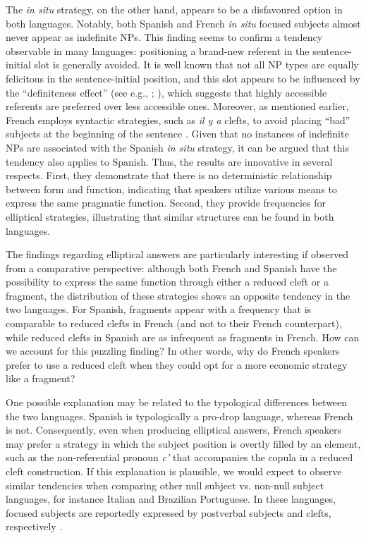 The \textit{in situ} strategy, on the other hand, appears to be a disfavoured option in both languages. Notably, both Spanish and French \textit{in situ} focused subjects almost never appear as indefinite NPs. This finding seems to confirm a tendency observable in many languages: positioning a brand-new referent in the sentence-initial slot is generally avoided. It is well known that not all NP types are equally felicitous in the sentence-initial position, and this slot appears to be influenced by the ``definiteness effect” (see e.g., \cite{keenan1976foregrounding}; \cite{mcnally1998existential}), which suggests that highly accessible referents are preferred over less accessible ones. Moreover, as mentioned earlier, French employs syntactic strategies, such as \textit{il y a} clefts, to avoid placing ``bad” subjects at the beginning of the sentence \parencite{karssenberg20186}. Given that no instances of indefinite NPs are associated with the Spanish \textit{in situ} strategy, it can be argued that this tendency also applies to Spanish.
Thus, the results are innovative in several respects. First, they demonstrate that there is no deterministic relationship between form and function, indicating that speakers utilize various means to express the same pragmatic function. Second, they provide frequencies for elliptical strategies, illustrating that similar structures can be found in both languages.

The findings regarding elliptical answers are particularly interesting if observed from a comparative perspective: although both French and Spanish have the possibility to express the same function through either a reduced cleft or a fragment, the distribution of these strategies shows an opposite tendency in the two languages. For Spanish, fragments appear with a frequency that is comparable to reduced clefts in French (and not to their French counterpart), while reduced clefts in Spanish are as infrequent as fragments in French.
How can we account for this puzzling finding? In other words, why do French speakers prefer to use a reduced cleft when they could opt for a more economic strategy like a fragment?

One possible explanation may be related to the typological differences between the two languages. Spanish is typologically a pro-drop language, whereas French is not. Consequently, even when producing elliptical answers, French speakers may prefer a strategy in which the subject position is overtly filled by an element, such as the non-referential pronoun \textit{c'} that accompanies the copula in a reduced cleft construction. If this explanation is plausible, we would expect to observe similar tendencies when comparing other null subject vs. non-null subject languages, for instance Italian and Brazilian Portuguese. In these languages, focused subjects are reportedly expressed by postverbal subjects and clefts, respectively \parencite{kato2006focus}.

